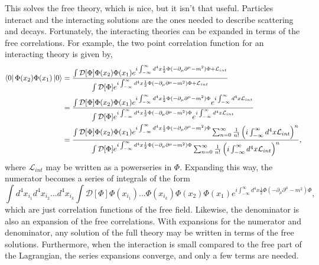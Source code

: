 \documentclass[12pt]{article}
\begin{document}
This solves the free theory, which is nice, but it isn't that useful. Particles interact and the interacting solutions are the ones needed to describe scattering and decays. Fortunately, the interacting theories can be expanded in terms of the free correlations. For example, the two point correlation function for an interacting theory is given by,
\begin{equation}
\begin{split}
\bra{0}\Phi(x_2)\Phi(x_1)\ket{0} &= 
\frac{\int \mathcal{D}[\Phi]\Phi(x_2)\Phi(x_1)e^{i\int_{-\infty}^{\infty} d^4x \frac{1}{2}\Phi (-\partial_\mu\partial^\mu - m^2)\Phi + \mathcal{L}_{int}}}
{\int \mathcal{D}[\Phi]e^{i\int_{-\infty}^{\infty} d^4x \frac{1}{2}\Phi (-\partial_\mu\partial^\mu - m^2)\Phi + \mathcal{L}_{int}}} \\
&= \frac{\int \mathcal{D}[\Phi]\Phi(x_2)\Phi(x_1)
e^{i\int_{-\infty}^{\infty} d^4x \frac{1}{2}\Phi (-\partial_\mu\partial^\mu - m^2)\Phi} e^{i\int_{-\infty}^{\infty} d^4x \mathcal{L}_{int}}}
{\int \mathcal{D}[\Phi]e^{i\int_{-\infty}^{\infty} d^4x \frac{1}{2}\Phi (-\partial_\mu\partial^\mu - m^2)\Phi}  e^{i\int_{-\infty}^{\infty} d^4x \mathcal{L}_{int}}} \\
&= \frac{\int \mathcal{D}[\Phi]\Phi(x_2)\Phi(x_1)
e^{i\int_{-\infty}^{\infty} d^4x \frac{1}{2}\Phi (-\partial_\mu\partial^\mu - m^2)\Phi} \sum_{n=0}^{\infty} \frac{1}{n!}\left(i\int_{-\infty}^{\infty} d^4x \mathcal{L}_{int}\right)^n}
{\int \mathcal{D}[\Phi]e^{i\int_{-\infty}^{\infty} d^4x \frac{1}{2}\Phi (-\partial_\mu\partial^\mu - m^2)\Phi} \sum_{n=0}^{\infty} \frac{1}{n!}\left(i\int_{-\infty}^{\infty} d^4x \mathcal{L}_{int}\right)^n }, \\
\end{split}
\end{equation}
where $\mathcal{L}_{int}$ may be written as a powerseries in $\Phi$. Expanding this way, the numerator becomes a series of integrals of the form
\begin{equation}
\int d^4x_{i_1}d^4x_{i_2} ... d^4x_{i_k} \int \mathcal{D}[\Phi]\Phi(x_{i_1})...\Phi(x_{i_k})\Phi(x_2)\Phi(x_1)e^{i\int_{-\infty}^{\infty} d^4x \frac{1}{2}\Phi (-\partial_\mu\partial^\mu - m^2)\Phi},
\end{equation} 
which are just correlation functions of the free field. Likewise, the denominator is also an expansion of the free correlations. With expansions for the numerator and denominator, any solution of the full theory may be written in terms of the free solutions. Furthermore, when the interaction is small compared to the free part of the Lagrangian, the series expansions converge, and only a few terms are needed.   
\end{document}
